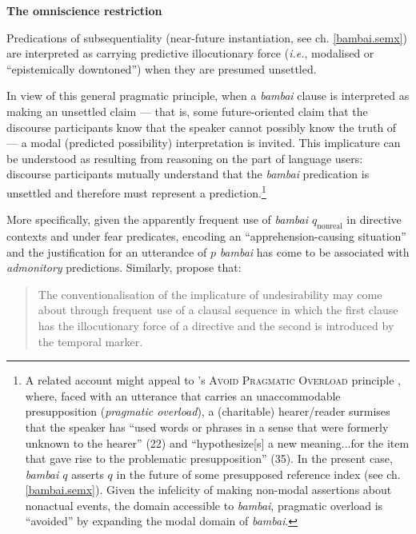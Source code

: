   \ex\textbf{The omniscience restriction}
  
Predications of subsequentiality (near-future instantiation, see ch. \ref{bambai.semx}) are interpreted as carrying predictive illocutionary force (\textit{i.e.}, modalised or ``epistemically downtoned'') when they are presumed unsettled.
  \xe
  
In view of this general pragmatic principle, when a \textit{bambai} clause is interpreted as making an unsettled claim --- that is, some future-oriented claim that the discourse participants know that the speaker cannot possibly know the truth of --- a modal (predicted possibility) interpretation is invited. This implicature can be understood as resulting from reasoning on the part of language users: discourse participants mutually understand that the \textit{bambai} predication is unsettled and therefore must represent a prediction.\footnote{A related account might appeal to \citeauthor{Eckardt2009}'s \textsc{Avoid Pragmatic Overload} principle \citeyearpar{Eckardt2009}, where, faced with an utterance that carries an unaccommodable presupposition (\textit{pragmatic overload}), a (charitable) hearer/reader surmises that the speaker has ``used words or phrases in a sense that were formerly unknown to the hearer'' (22) and ``hypothesize[s] a new meaning...for the item that gave rise to the problematic presupposition'' (35). In the present case, \textit{bambai $ q $} asserts $ q $ in the future of some presupposed reference index (see ch. \ref{bambai.semx}). Given the infelicity of making non-modal assertions about nonactual events, the domain accessible to \textit{bambai}, pragmatic overload is ``avoided'' by expanding the modal domain of \textit{bambai}.}%


 More specifically, given the apparently frequent use of \textit{bambai $ q_{\text{nonreal}} $} in directive contexts and under fear predicates, encoding an ``apprehension-causing situation'' \citep[298]{Lichtenberk1995} and the justification for an utterandce of $ p $ \textit{bambai} has come to be associated with \textit{admonitory} predictions. Similarly, \citet[285]{Angelo2016} propose that:
 \begin{quote}
 	{\small
 		The conventionalisation of the implicature of undesirability may come about through frequent use of a clausal sequence in which the first clause has the illocutionary force of a directive and the second is introduced by the temporal marker.}\end{quote} 
 
